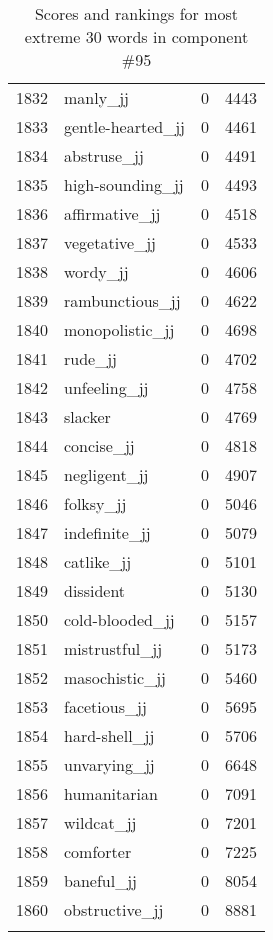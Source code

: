\begin{longtable}[!htbp]{| rlr@{.}l |}
    1832 & manly\_jj & 0 & 4443 \\
    1833 & gentle-hearted\_jj & 0 & 4461 \\
    1834 & abstruse\_jj & 0 & 4491 \\
    1835 & high-sounding\_jj & 0 & 4493 \\
    1836 & affirmative\_jj & 0 & 4518 \\
    1837 & vegetative\_jj & 0 & 4533 \\
    1838 & wordy\_jj & 0 & 4606 \\
    1839 & rambunctious\_jj & 0 & 4622 \\
    1840 & monopolistic\_jj & 0 & 4698 \\
    1841 & rude\_jj & 0 & 4702 \\
    1842 & unfeeling\_jj & 0 & 4758 \\
    1843 & slacker & 0 & 4769 \\
    1844 & concise\_jj & 0 & 4818 \\
    1845 & negligent\_jj & 0 & 4907 \\
    1846 & folksy\_jj & 0 & 5046 \\
    1847 & indefinite\_jj & 0 & 5079 \\
    1848 & catlike\_jj & 0 & 5101 \\
    1849 & dissident & 0 & 5130 \\
    1850 & cold-blooded\_jj & 0 & 5157 \\
    1851 & mistrustful\_jj & 0 & 5173 \\
    1852 & masochistic\_jj & 0 & 5460 \\
    1853 & facetious\_jj & 0 & 5695 \\
    1854 & hard-shell\_jj & 0 & 5706 \\
    1855 & unvarying\_jj & 0 & 6648 \\
    1856 & humanitarian & 0 & 7091 \\
    1857 & wildcat\_jj & 0 & 7201 \\
    1858 & comforter & 0 & 7225 \\
    1859 & baneful\_jj & 0 & 8054 \\
    1860 & obstructive\_jj & 0 & 8881 \\
    \hline
    \caption{Scores and rankings for most extreme 30 words in component \#95} \\
\end{longtable}
